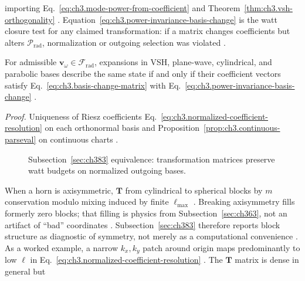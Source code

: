 importing Eq.~\eqref{eq:ch3.mode-power-from-coefficient} and Theorem~\ref{thm:ch3.vsh-orthogonality} \cite{poynting1884}.
Equation~\eqref{eq:ch3.power-invariance-basis-change} is the watt closure test for any claimed transformation: if a matrix changes
coefficients but alters \(\mathcal{P}_{\mathrm{rad}}\), normalization or outgoing selection was violated \cite{hansen1988}.
\begin{theorem}
\label{thm:ch3.basis-equivalence-invariance}
For admissible \(\mathbf{v}_\omega\in\mathcal{F}_{\mathrm{rad}}\), expansions in VSH, plane-wave, cylindrical, and parabolic bases
describe the same state if and only if their coefficient vectors satisfy Eq.~\eqref{eq:ch3.basis-change-matrix} with
Eq.~\eqref{eq:ch3.power-invariance-basis-change} \cite{hansen1988}.
\end{theorem}
\noindent\textit{Proof.}
Uniqueness of Riesz coefficients Eq.~\eqref{eq:ch3.normalized-coefficient-resolution} on each orthonormal basis and
Proposition~\ref{prop:ch3.continuous-parseval} on continuous charts \cite{stratton1941}.
\begin{figure}[t]
\centering
{}
\caption{Subsection~\ref{sec:ch383} equivalence: transformation matrices preserve watt budgets on normalized outgoing bases.}
\label{fig:ch3.383-matrix-chain}
\end{figure}
When a horn is axisymmetric, \(\mathbf{T}\) from cylindrical to spherical blocks by \(m\) conservation modulo mixing induced by
finite \(\ell_{\max}\) \cite{harrington2001}. Breaking axisymmetry fills formerly zero blocks; that filling is
physics from Subsection~\ref{sec:ch363}, not an artifact of ``bad'' coordinates \cite{harrington2001}. Subsection~\ref{sec:ch383}
therefore reports block structure as diagnostic of symmetry, not merely as a computational convenience \cite{stratton1941}.
As a worked example, a narrow \(k_{x},k_{y}\) patch around origin maps predominantly to low \(\ell\) in
Eq.~\eqref{eq:ch3.normalized-coefficient-resolution} \cite{hansen1988}. The \(\mathbf{T}\) matrix is dense in general but

